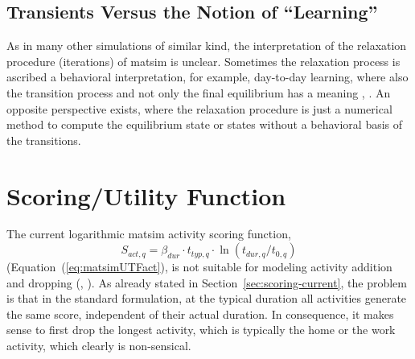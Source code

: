
\subsection{Transients Versus the Notion of \enquote{Learning}}
\label{sec:transients-vs-learning}
As in many other simulations of similar kind, the interpretation of the relaxation procedure (iterations) of \gls{matsim} is unclear. 
%
Sometimes the relaxation process is ascribed a behavioral interpretation, for example, day-to-day learning, where also the transition process and not only the final equilibrium has a meaning \citep[][p.128]{LiuEtAl_TransResA_2006}, \citep[][p.523]{NagelBarrett1997feedback}. 
%
An opposite perspective exists, where the relaxation procedure is just a numerical method to compute the equilibrium state or states without a behavioral basis of the transitions.

\section{Scoring/Utility Function}
\label{sec:future-of-scoring-function}
The current logarithmic \gls{matsim} activity scoring function,
\[
S_{act,q} = \beta_{dur} \cdot t_{typ,q} \cdot \ln(t_{dur,q}/t_{0,q}) 
\]
(\cf Equation~(\ref{eq:matsimUTFact}), is not suitable for modeling activity
addition and dropping (\citet[][p.127f]{Feil_PhDThesis_2010}, \citet[][]{MATSim_Userguide_2015}).
%
As already stated in Section~\ref{sec:scoring-current}, the problem is that in the standard formulation, at the typical duration all activities generate the same score, independent of their actual duration.  In consequence, it makes sense to first drop the longest activity, which is typically the home or the work activity, which clearly is non-sensical.

